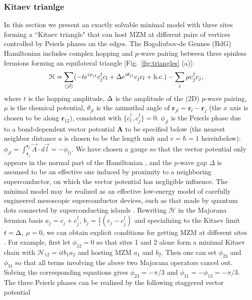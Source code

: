 \subsubsection{Kitaev trianlge}
In this section we present an exactly solvable minimal model with three sites forming a ``Kitaev triangle" that can host MZM at different pairs of vertices controlled by Peierls phases on the edges. The Bogoliubov-de Gennes (BdG) Hamiltonian includes complex hopping and $p$-wave pairing between three spinless fermions forming an equilateral triangle [Fig.~\ref{fig:triangles} (a)]:
\begin{equation}\label{eq:HBdG}
  \mathcal{H} = \sum_{\langle j l \rangle} (-te^{i\phi_{jl}}c^{\dagger}_{j} c_l + \Delta e^{i\theta_{jl}} c_{j} c_l + {\rm h.c.}) - \sum_{j} \mu c^{\dagger}_j c_j,
\end{equation}
where $t$ is the hopping amplitude, $\Delta$ is the amplitude of the (2D) $p$-wave pairing, $\mu$ is the chemical potential, $\theta_{jl}$ is the azimuthal angle of $\mathbf r_{jl} = \mathbf r_l - \mathbf r_j$ (the $x$ axis is chosen to be along $\mathbf r_{12}$), consistent with $\{c^\dag_l, c^\dag_j\} = 0$. $\phi_{jl}$ is the Peierls phase due to a bond-dependent vector potential $\mathbf A$ to be specified below (the nearest neighbor distance $a$ is chosen to be the length unit and $e=\hbar=1$ hereinbelow): $\phi_{jl} = \int_{\mathbf r_j}^{\mathbf r_{l}} \vec{A} \cdot d\vec{l} = -\phi_{lj}$. We have chosen a gauge so that the vector potential only appears in the normal part of the Hamiltonian \cite{DeGennes_book}, and the $p$-wave gap $\Delta$ is assumed to be an effective one induced by proximity to a neighboring superconductor, on which the vector potential has negligible influence. The minimal model may be realized as an effective low-energy model of carefully engineered mesoscopic superconductor devices, such as that made by quantum dots connected by superconducting islands \cite{dvirRealizationMinimalKitaev2023}. Rewriting $\mathcal{H}$ in the Majorana fermion basis $a_{j} = c_j + c^\dag_j$, $b_j = \frac{1}{i}(c_j - c^\dag_j)$ and specializing to the Kitaev limit $t=\Delta$, $\mu=0$, we can obtain explicit conditions for getting MZM at different sites \cite{supp}. For example, first let $\phi_{12} = 0$ so that sites 1 and 2 alone form a minimal Kitaev chain with $\mathcal{H}_{12} = itb_1a_2$ and hosting MZM $a_1$ and $b_2$. Then one can set $\phi_{23}$ and $\phi_{31}$ so that all terms involving the above two Majorana operators cancel out. Solving the corresponding equations gives $\phi_{23} = -\pi/3$ and $\phi_{31} =-\phi_{13} = -\pi/3$. The three Peierls phases can be realized by the following staggered vector potential
